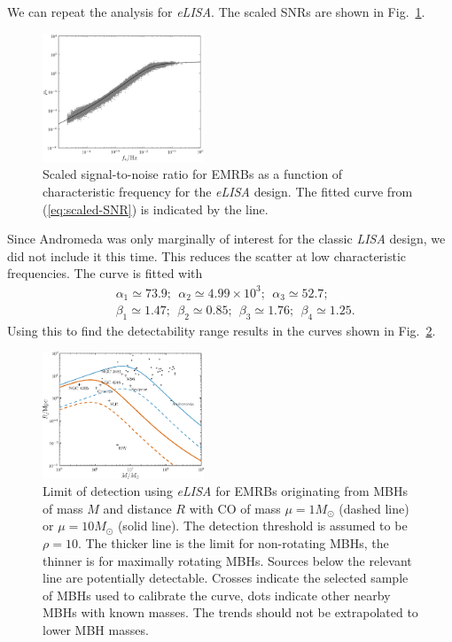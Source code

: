 \documentclass[useAMS,usedcolumn,usegraphicx,usenatbib]{mn2e}
\newcommand{\eqnref}[1]{(\ref{eq:#1})}
\newcommand{\figref}[1]{Fig.~\ref{fig:#1}}
\begin{document}
We can repeat the analysis for \textit{eLISA}. The scaled SNRs are shown in \figref{scaled-SNR-eLISA}.
\begin{figure}
\begin{center}
 \includegraphics[width=0.43\textwidth]{Fig_SNR_scaled_fit_eLISA_small}
 \caption{Scaled signal-to-noise ratio for EMRBs as a function of characteristic frequency for the \textit{eLISA} design. The fitted curve from \eqnref{scaled-SNR} is indicated by the line.\label{fig:scaled-SNR-eLISA}}
   \end{center}
\end{figure}
Since Andromeda was only marginally of interest for the classic \textit{LISA} design, we did not include it this time. This reduces the scatter at low characteristic frequencies. The curve is fitted with
\begin{equation}
\begin{split}
&\alpha_1 \simeq 73.9; \ \ \alpha_2 \simeq 4.99 \times 10^3; \ \ \alpha_3 \simeq 52.7;\\
&\beta_1 \simeq 1.47; \ \ \beta_2 \simeq 0.85; \ \ \beta_3 \simeq 1.76; \ \ \beta_4 \simeq 1.25.
\end{split}
\end{equation}
Using this to find the detectability range results in the curves shown in \figref{detect-eLISA}.
\begin{figure}
\begin{center}
 \includegraphics[width=0.43\textwidth]{Fig_M_R_detect_2}
 \caption{Limit of detection using \textit{eLISA} for EMRBs originating from MBHs of mass $M$ and distance $R$ with CO of mass $\mu = 1 M_\odot$ (dashed line) or $\mu = 10 M_\odot$ (solid line). The detection threshold is assumed to be $\rho = 10$. The thicker line is the limit for non-rotating MBHs, the thinner is for maximally rotating MBHs. Sources below the relevant line are potentially detectable. Crosses indicate the selected sample of MBHs used to calibrate the curve, dots indicate other nearby MBHs with known masses. The trends should not be extrapolated to lower MBH masses.\label{fig:detect-eLISA}}
   \end{center}
\end{figure}
\end{document}
